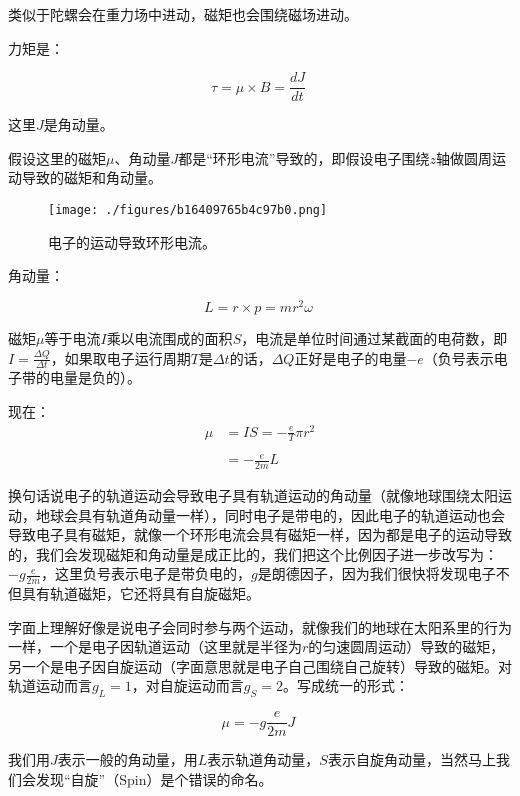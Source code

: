 类似于陀螺会在重力场中进动，磁矩也会围绕磁场进动。

力矩是：

\begin{equation}
\tau = \mu \times B = \frac{d J}{d t}~
\end{equation}

这里$J$是角动量。

假设这里的磁矩$\mu $、角动量$J $都是“环形电流”导致的，即假设电子围绕$z$轴做圆周运动导致的磁矩和角动量。

\begin{figure}[ht]
\centering
\texttt{[image: ./figures/b16409765b4c97b0.png]}
\caption{电⼦的运动导致环形电流。} \label{fig_QMPre2_14}
\end{figure}

角动量：

\begin{equation}
L = r \times p =  m r^2 \omega ~
\end{equation}

磁矩$\mu$等于电流$I$乘以电流围成的面积$S$，电流是单位时间通过某截面的电荷数，即$I = \frac{\Delta Q}{\Delta t}$，如果取电子运行周期$T$是$\Delta t $的话，$\Delta Q$正好是电子的电量$- e$（负号表示电子带的电量是负的）。

现在：
\begin{align}
\mu &= IS = -\frac{e}{T} \pi r^2 \\\\
    &= -\frac{e}{2m} L~
\end{align}


换句话说电子的轨道运动会导致电子具有轨道运动的角动量（就像地球围绕太阳运动，地球会具有轨道角动量一样），同时电子是带电的，因此电子的轨道运动也会导致电子具有磁矩，就像一个环形电流会具有磁矩一样，因为都是电子的运动导致的，我们会发现磁矩和角动量是成正比的，我们把这个比例因子进一步改写为：$- g \frac{e}{2m}$，这里负号表示电子是带负电的，$g$是朗德因子，因为我们很快将发现电子不但具有轨道磁矩，它还将具有自旋磁矩。

字面上理解好像是说电子会同时参与两个运动，就像我们的地球在太阳系里的行为一样，一个是电子因轨道运动（这里就是半径为$r$的匀速圆周运动）导致的磁矩，另一个是电子因自旋运动（字面意思就是电子自己围绕自己旋转）导致的磁矩。对轨道运动而言$g_L = 1$，对自旋运动而言$g_S = 2$。写成统一的形式：

\begin{equation}
\mu = - g \frac{e}{2m} J~
\end{equation}

我们用$J$表示一般的角动量，用$L$表示轨道角动量，$S$表示自旋角动量，当然马上我们会发现“自旋”（Spin）是个错误的命名。

